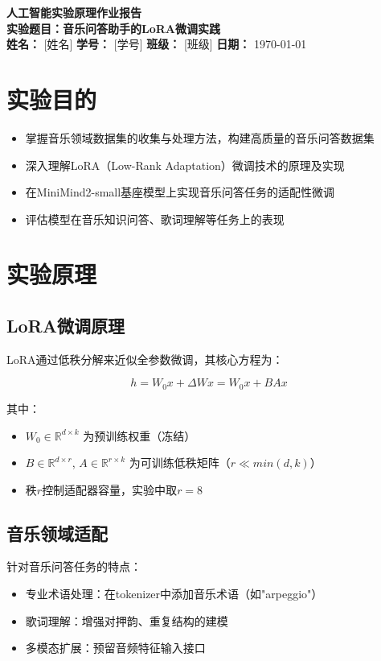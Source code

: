 \documentclass[a4paper,11pt]{article}
\begin{document}
\begin{center}
    {\LARGE \textbf{人工智能实验原理作业报告}} \\[0.3cm]
    {\Large \textbf{实验题目：音乐问答助手的LoRA微调实践}} \\[0.2cm]
    \textbf{姓名：} [姓名] \quad \textbf{学号：} [学号] \quad \textbf{班级：} [班级] \quad \textbf{日期：} \today
\end{center}

\begin{center}
\makebox[\textwidth]{\dotfill}
\end{center}

\section{实验目的}
\begin{itemize}
    \item 掌握音乐领域数据集的收集与处理方法，构建高质量的音乐问答数据集
    \item 深入理解LoRA（Low-Rank Adaptation）微调技术的原理及实现
    \item 在MiniMind2-small基座模型上实现音乐问答任务的适配性微调
    \item 评估模型在音乐知识问答、歌词理解等任务上的表现
\end{itemize}

\section{实验原理}
\subsection{LoRA微调原理}
LoRA通过低秩分解来近似全参数微调，其核心方程为：

\begin{equation}
    h = W_0x + \Delta Wx = W_0x + BAx
\end{equation}

其中：
\begin{itemize}
    \item $W_0 \in \mathbb{R}^{d\times k}$ 为预训练权重（冻结）
    \item $B \in \mathbb{R}^{d\times r}$, $A \in \mathbb{R}^{r\times k}$ 为可训练低秩矩阵（$r \ll min(d,k)$）
    \item 秩$r$控制适配器容量，实验中取$r=8$
\end{itemize}

\subsection{音乐领域适配}
针对音乐问答任务的特点：
\begin{itemize}
    \item 专业术语处理：在tokenizer中添加音乐术语（如"arpeggio"）
    \item 歌词理解：增强对押韵、重复结构的建模
    \item 多模态扩展：预留音频特征输入接口
\end{itemize}
\end{document}
